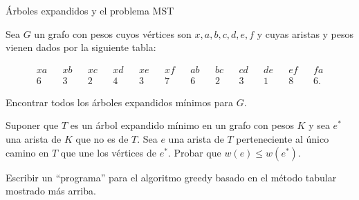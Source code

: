 \begin{section}{Árboles expandidos y el problema MST}
\begin{enumex}
\item Sea $G$ un grafo con pesos cuyos vértices son $x,a,b,c,d,e,f$ y cuyas aristas y pesos vienen dados por la siguiente tabla:

\begin{align*}
xa &&xb &&xc &&xd &&xe &&xf &&ab &&bc &&cd &&de &&ef &&fa \\
6  &&3  &&2  &&4  &&3  &&7  &&6  &&2  &&3  &&1  &&8  &&6.
\end{align*}

Encontrar todos los árboles expandidos mínimos para $G$.

\item Suponer que $T$ es un árbol expandido mínimo en un grafo con pesos $K$ y sea $e^*$ una arista de $K$ que no es de $T$. Sea $e$ una arista de $T$ perteneciente al único camino en $T$ que une los vértices de $e^*$. Probar que $w(e) \le w(e^*)$. 

\item Escribir un ``programa'' para el algoritmo greedy basado en el
método ta\-bu\-lar mostrado más arriba.
\end{enumex}


\end{section}
